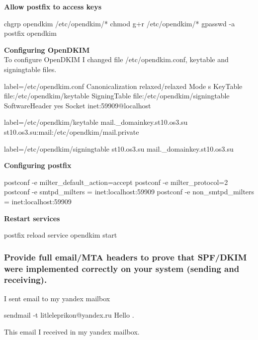 \documentclass[a4paper,11pt]{article}
\begin{document}
\textbf{Allow postfix to access keys}

\begin{bashcode}
chgrp opendkim /etc/opendkim/*
chmod g+r /etc/opendkim/*
gpasswd -a postfix opendkim
\end{bashcode}

\textbf{Configuring OpenDKIM}\\
To configure OpenDKIM I changed file /etc/opendkim.conf, keytable and signingtable  files.

\begin{bashcode*}{label=/etc/opendkim.conf}
Canonicalization relaxed/relaxed
Mode s
KeyTable file:/etc/opendkim/keytable
SigningTable file:/etc/opendkim/signingtable
SoftwareHeader yes
Socket inet:59909@localhost
\end{bashcode*}

\begin{bashcode*}{label=/etc/opendkim/keytable}
mail._domainkey.st10.os3.su st10.os3.su:mail:/etc/opendkim/mail.private 
\end{bashcode*}

\begin{bashcode*}{label=/etc/opendkim/signingtable}
st10.os3.su mail._domainkey.st10.os3.su 
\end{bashcode*}

\textbf{Configuring postfix}
\begin{bashcode}
postconf -e milter_default_action=accept
postconf -e milter_protocol=2
postconf -e smtpd_milters = inet:localhost:59909
postconf -e non_smtpd_milters = inet:localhost:59909
\end{bashcode}

\textbf{Restart services}
\begin{bashcode}
postfix reload
service opendkim start
\end{bashcode}

\subsubsection{Provide full email/MTA headers to prove that SPF/DKIM were implemented correctly on your system (sending and receiving).}
I sent email to my yandex mailbox
\begin{bashcode}
sendmail -t litleleprikon@yandex.ru
Hello
.
\end{bashcode}

This email I received in my yandex mailbox.
\end{document}
